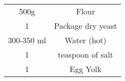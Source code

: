 \begin{tabular}{c | c}
  500g & Flour \\
  1 &  Package dry yeast \\
  300-350 ml & Water (hot) \\
  1 & teaspoon of salt \\
  1 & Egg Yolk \\
\end{tabular}